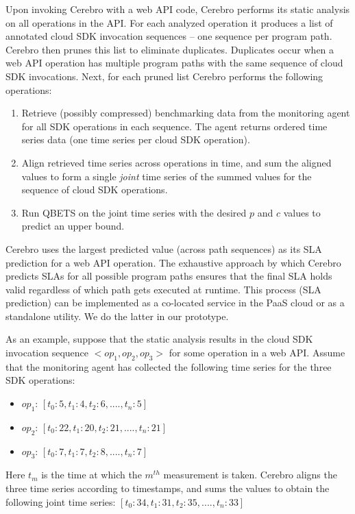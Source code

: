 Upon invoking Cerebro with a web API code, Cerebro
performs its static analysis on all operations in the API. For each
analyzed operation it produces a list of annotated cloud SDK invocation sequences --
one sequence per program path. Cerebro then prunes this list to eliminate duplicates.
Duplicates occur when a web API operation has
multiple program paths with the same sequence of cloud SDK invocations.
Next, for each pruned list Cerebro performs the following operations:
\begin{enumerate}
\item Retrieve (possibly compressed) benchmarking data from the monitoring agent 
for all SDK operations in each sequence. The agent returns
ordered time series data (one time series per cloud SDK operation).
\item Align retrieved time series across operations in time, and sum the aligned
values
to form a single \textit{joint} time series of the summed values for the 
sequence of cloud SDK operations.
\item Run QBETS on the joint time series with the 
desired $p$ and $c$ values to predict an upper bound. 
\end{enumerate}
Cerebro uses the largest predicted value (across path sequences) 
as its SLA prediction for a web API operation. The exhaustive approach by 
which Cerebro predicts SLAs for all possible program paths ensures that
the final SLA holds valid regardless of which path gets executed at runtime.
This process (SLA prediction) can be implemented
as a co-located service in the PaaS cloud or as a standalone utility.  We do 
the latter in our prototype.

As an example, suppose that the static analysis results in the
cloud SDK invocation sequence $<op_{1},op_{2},op_{3}>$ for
some operation in a web API. 
Assume that the monitoring agent has collected the following
time series for the three SDK operations:
\begin{itemize}
\item $op_{1}$: $[t_{0}: 5, t_{1}: 4, t_{2}: 6, ...., t_{n}: 5]$
\item $op_{2}$: $[t_{0}: 22, t_{1}: 20, t_{2}: 21, ...., t_{n}: 21]$
\item $op_{3}$: $[t_{0}: 7, t_{1}: 7, t_{2}: 8, ...., t_{n}: 7]$
\end{itemize}

Here $t_{m}$ is the time at which the $m^{th}$ measurement is taken.
Cerebro aligns the three time series according to timestamps, 
and sums the values
to obtain the following joint time series:
$[t_{0}: 34, t_{1}: 31, t_{2}: 35, ...., t_{n}: 33]$

